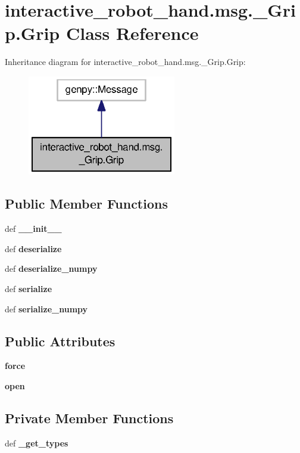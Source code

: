 \section{interactive\-\_\-robot\-\_\-hand.\-msg.\-\_\-\-Grip.\-Grip Class Reference}
\label{classinteractive__robot__hand_1_1msg_1_1__Grip_1_1Grip}


Inheritance diagram for interactive\-\_\-robot\-\_\-hand.\-msg.\-\_\-\-Grip.\-Grip\-:\nopagebreak
\begin{figure}[H]
\begin{center}
\leavevmode
\includegraphics[width=184pt]{classinteractive__robot__hand_1_1msg_1_1__Grip_1_1Grip__inherit__graph}
\end{center}
\end{figure}
\subsection*{Public Member Functions}
\begin{DoxyCompactItemize}
\item 
def {\bf \-\_\-\-\_\-init\-\_\-\-\_\-}
\item 
def {\bf deserialize}
\item 
def {\bf deserialize\-\_\-numpy}
\item 
def {\bf serialize}
\item 
def {\bf serialize\-\_\-numpy}
\end{DoxyCompactItemize}
\subsection*{Public Attributes}
\begin{DoxyCompactItemize}
\item 
{\bf force}
\item 
{\bf open}
\end{DoxyCompactItemize}
\subsection*{Private Member Functions}
\begin{DoxyCompactItemize}
\item 
def {\bf \-\_\-get\-\_\-types}
\end{DoxyCompactItemize}
